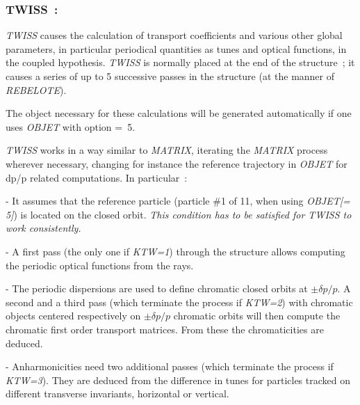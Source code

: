  \newpage


\subsubsection*{TWISS~: \TWISSTitl}\label{TWISS} 
\medskip

\textsl{TWISS}   causes the calculation of 
  transport coefficients and various other global parameters, in particular 
periodical quantities as tunes and optical functions, in the coupled hypothesis.  
 \textsl{TWISS} is normally placed at the end of the structure~; it  causes a series 
of up to 5 successive passes in the structure (at the manner of \textsl{REBELOTE}). 

\medskip 

\noindent  The object necessary for these calculations 
  will be generated automatically if one uses \textsl{OBJET}  with
option \mbox{\KOBJ= 5}.   

 \medskip 

\noindent \textsl{TWISS} works in a way similar to \textsl{MATRIX}, iterating the \textsl{MATRIX} process wherever necessary, 
changing for instance the reference trajectory in \textsl{OBJET} for dp/p related computations. 
\noindent In particular~: 

\medskip

- It assumes that the reference particle (particle \#1 of 11, when using \textsl{OBJET[\KOBJ= 5]}) is located on 
the closed orbit. \textsl{This condition has to be satisfied for TWISS to work consistently. }   

- A first pass (the only one if \textsl{KTW=1}) through the structure allows computing the periodic 
optical functions  from the  rays.

- The periodic dispersions  are used to define chromatic closed orbits at $\pm \delta p / p$. A second and a third pass 
(which terminate the process if \textsl{KTW=2}) with 
chromatic objects centered respectively  on $\pm \delta p / p$ chromatic orbits will then compute the chromatic 
first order transport matrices. From these the chromaticities are deduced. 

- Anharmonicities need two additional passes (which terminate the process if \textsl{KTW=3}). 
They are deduced from the difference in tunes for particles 
tracked on different transverse invariants, horizontal or vertical. 



\newpage




